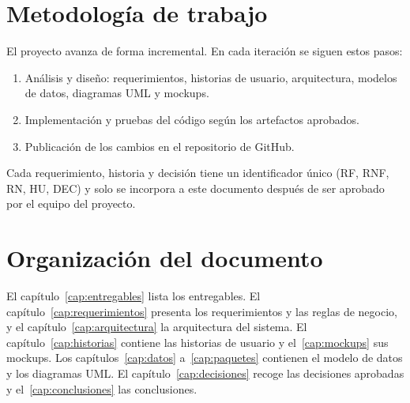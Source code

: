 \section{Metodología de trabajo}
El proyecto avanza de forma incremental. En cada iteración se siguen estos pasos:
\begin{enumerate}
  \item Análisis y diseño: requerimientos, historias de usuario, arquitectura, modelos de datos, diagramas UML y mockups.
  \item Implementación y pruebas del código según los artefactos aprobados.
  \item Publicación de los cambios en el repositorio de GitHub.
\end{enumerate}
Cada requerimiento, historia y decisión tiene un identificador único (RF, RNF, RN, HU, DEC) y solo se incorpora a este documento después de ser aprobado por el equipo del proyecto.

\section{Organización del documento}
El capítulo~\ref{cap:entregables} lista los entregables. El capítulo~\ref{cap:requerimientos} presenta los requerimientos y las reglas de negocio, y el capítulo~\ref{cap:arquitectura} la arquitectura del sistema. El capítulo~\ref{cap:historias} contiene las historias de usuario y el~\ref{cap:mockups} sus mockups. Los capítulos~\ref{cap:datos} a~\ref{cap:paquetes} contienen el modelo de datos y los diagramas UML. El capítulo~\ref{cap:decisiones} recoge las decisiones aprobadas y el~\ref{cap:conclusiones} las conclusiones.
